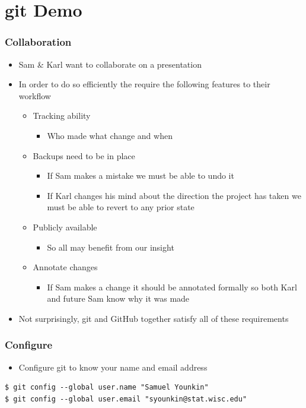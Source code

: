 \documentclass[handout,13pt,compress,c]{beamer}
\newcommand{\bi}{\begin{itemize}}
\newcommand{\ei}{\end{itemize}}
\begin{document}
\section{git Demo}
\begin{frame}[fragile]
\frametitle{Collaboration}
\bi
\item Sam \& Karl want to collaborate on a presentation
\item In order to do so efficiently the require the following features to their workflow
\bi
\item Tracking ability
\bi\item Who made what change and when\ei
\item Backups need to be in place
\bi\item If Sam makes a mistake we must be able to undo it
\item If Karl changes his mind about the direction the project has taken we must be able to revert to any prior state
\ei
\item Publicly available
\bi\item So all may benefit from our insight\ei
\item Annotate changes
\bi\item If Sam makes a change it should be annotated formally so both Karl and future Sam know why it was made\ei
\ei
\item Not surprisingly, git and GitHub together satisfy all of these requirements
\ei
\end{frame}
\begin{frame}[fragile]
\frametitle{Configure}
\bi
\item Configure git to know your name and email address
\ei
\begin{semiverbatim}
\begin{lstlisting}
$ git config --global user.name "Samuel Younkin"
$ git config --global user.email "syounkin@stat.wisc.edu"
\end{lstlisting}
\end{semiverbatim}
\end{frame}
\end{document}
